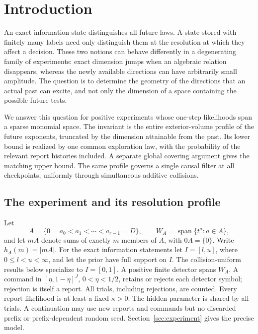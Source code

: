 \section{Introduction}
An exact information state distinguishes all future laws. A state stored
with finitely many labels need only distinguish them at the resolution
at which they affect a decision. These two notions can behave differently
in a degenerating family of experiments: exact dimension jumps when an
algebraic relation disappears, whereas the newly available directions
can have arbitrarily small amplitude. The question is to determine the
geometry of the directions that an actual past can excite, and not only
the dimension of a space containing the possible future tests.

We answer this question for positive experiments whose one-step
likelihoods span a sparse monomial space. The invariant is the entire
exterior-volume profile of the future exponents, truncated by the
dimension attainable from the past. Its lower bound is realized by one
common exploration law, with the probability of the relevant report
histories included. A separate global covering argument gives the
matching upper bound. The same profile governs a single causal filter
at all checkpoints, uniformly through simultaneous additive collisions.

\subsection{The experiment and its resolution profile}
Let
\[
 A=\{0=a_0<a_1<\cdots<a_{r-1}=D\},\qquad
 W_A=\operatorname{span}\{t^a:a\in A\},
\]
and let $mA$ denote sums of exactly $m$ members of $A$, with $0A=\{0\}$.
Write $h_A(m)=|mA|$. For the exact information statements let
$I=[l,u]$, where $0\le l<u<\infty$, and let the prior have full support
on $I$. The collision-uniform results below specialize to $I=[0,1]$.
A positive finite detector spans $W_A$. A command in
$[\eta,1-\eta]^J$, $0<\eta<1/2$, retains or rejects each detector
symbol; rejection is itself a report. All trials, including rejections,
are counted. Every report likelihood is at least a fixed $\kappa>0$.
The hidden parameter is shared by all trials. A continuation may use
new reports and commands but no discarded prefix or prefix-dependent
random seed. Section~\ref{sec:experiment} gives the precise model.

